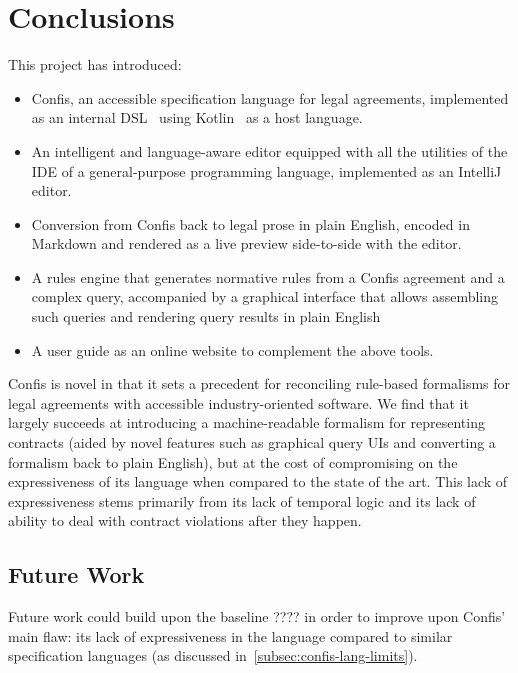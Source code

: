 \chapter{Conclusions}\label{ch:conclusions}

This project has introduced:
\begin{itemize}
    \item Confis, an accessible specification language for legal agreements, implemented as an internal DSL~\cite{fowlerDsl} using Kotlin~\cite{kotlinLang} as a host language.
    \item An intelligent and language-aware editor equipped with all the utilities of the IDE of a general-purpose programming language, implemented as an IntelliJ~\cite{intelliJRepo} editor.
    \item Conversion from Confis back to legal prose in plain English, encoded in Markdown and rendered as a live preview side-to-side with the editor.
    \item A rules engine that generates normative rules from a Confis agreement and a complex query, accompanied by a graphical interface that allows assembling such queries and rendering query results in plain English
    \item A user guide as an online website to complement the above tools.
\end{itemize}


Confis is novel in that it sets a precedent for reconciling rule-based formalisms for legal agreements with accessible industry-oriented software.
We find that it largely succeeds at introducing a machine-readable formalism for representing contracts (aided by novel features such as graphical query UIs and converting a formalism back to plain English), but at the cost of compromising on the expressiveness of its language when compared to the state of the art.
This lack of expressiveness stems primarily from its lack of temporal logic and its lack of ability to deal with contract violations after they happen.

\section{Future Work}\label{sec:future-work}

Future work could build upon the baseline ???? in order to improve upon Confis' main flaw: its lack of expressiveness in the language compared to similar specification languages (as discussed in~\autoref{subsec:confis-lang-limits}).

